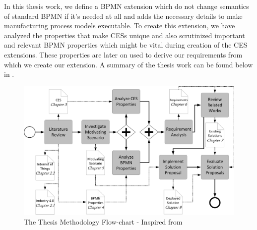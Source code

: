 In this thesis work, we define a \acs{BPMN} extension which do not change semantics of standard \acs{BPMN} if it's needed at all and adds the necessary details to make manufacturing process models executable. To create this extension, we have analyzed the properties that make \acs{CES}s unique and also scrutinized important and relevant \acs{BPMN} properties which might be vital during creation of the \acs{CES} extensions. These properties are later on used to derive our requirements from which we create our extension. A summary of the thesis work can be found below in .
\begin{figure}[h!]
	\includegraphics[scale=0.55]{./gfx/outline}
	\centering
	\caption{The Thesis Methodology Flow-chart - Inspired from \cite{TIMURTHESIS}}
	\label{fig:1.3}
\end{figure}
